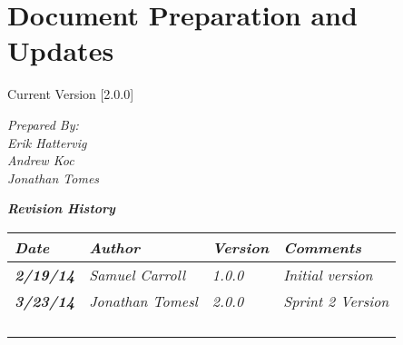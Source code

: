 
\chapter{Document Preparation and Updates}

Current Version [2.0.0]
\vspace*{5mm}

{\color{MSBlue3}
\noindent
\textit{Prepared By:}\\
\textit{Erik Hattervig}\\
\textit{Andrew Koc}\\
\textit{Jonathan Tomes}
}

\vfill
\noindent
{\color{color02} \textit{\textbf{Revision History}}}\\
\begin{tabular}{|>{\raggedright}p{1.5cm}|>{\raggedright}p{3cm}|>{\raggedright}p{1.5cm}|>{\raggedright}p{9cm}|}
\hline
\textit{\textbf{Date}} &  \textit{\textbf{Author}} & \textit{\textbf{Version}} & \textit{\textbf{Comments}}\tabularnewline
\hline
 \textit{\textbf{2/19/14}} & \textit{Samuel Carroll} & \textit{1.0.0} & \textit{Initial version}\tabularnewline
\hline
 \textit{\textbf{3/23/14}} & \textit{Jonathan Tomesl} & \textit{2.0.0} & \textit{Sprint 2 Version}\tabularnewline
 \hline
 &  &  & \tabularnewline
\hline
 &  &  & \tabularnewline
\hline
 &  &  & \tabularnewline
\hline
 &  &  & \tabularnewline
\hline
\end{tabular}
\vfill

